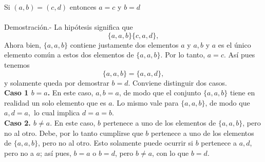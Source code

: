     \begin{teo}
	Si $(a,b) = (c,d)$ entonces $a=c$ y $b=d$\\\\
	    
	    Demostración.-\; La hipótesis significa que $$\lbrace {a},{a,b} \rbrace \lbrace {c},{a,d}\rbrace,$$
	    Ahora bien, $\lbrace {a},{a,b} \rbrace$ contiene justamente dos elementos ${a}$ y ${a,b}$ y $a$ es el único elemento común a estos dos elementos de $\lbrace{a},{a,b}\rbrace$. Por lo tanto, $a=c$. Así pues tenemos $$\lbrace {a},{a,b}\rbrace = \lbrace {a},{a,d} \rbrace,$$ y solamente queda por demostrar $b=d.$ Conviene distinguir dos casos.\\
	    \textbf{Caso 1 $b=a$.} En este caso, ${a,b}={a}$, de modo que el conjunto $\lbrace {a},{a,b}\rbrace$ tiene en realidad un solo elemento que es ${a}$. Lo mismo vale para $\lbrace {a},{a,b}\rbrace$, de modo que ${a,d}={a},$ lo cual implica $d=a=b.$\\
	    \textbf{Caso 2. $b\neq a$}. En este caso, $b$ pertenece a uno de los elementos de $\lbrace {a}, {a,b}\rbrace$, pero no al otro. Debe, por lo tanto cumplirse que $b$ pertenece a uno de los elementos de $\lbrace {a},{a,b}\rbrace$, pero no al otro. Esto solamente puede ocurrir si $b$ pertenece a ${a,d}$, pero no a ${a}$; así pues, $b=a$ o $b=d$, pero $b\neq a$, con lo que $b=d$.\\\\

    \end{teo}

